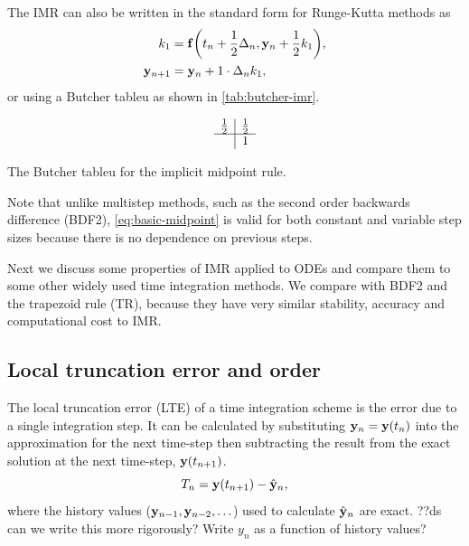 The IMR can also be written in the standard form for Runge-Kutta methods as
\begin{equation}
  \begin{aligned}
    k_1 &= {\mathbf{f}{\left( t_n + \frac{1}{2} \Delta_{n}, \mathbf{y}_n + \frac{1}{2} k_1 \right)}}, \\
    \mathbf{y}_{n+1} &= \mathbf{y}_n + 1 \cdot \Delta_{n} k_1,
  \end{aligned}
\end{equation}
or using a Butcher tableu \cite[135]{HairerNorsettWanner} as shown in \autoref{tab:butcher-imr}.

\begin{table}
  \begin{equation*}
    \begin{array}{c|c}
      \frac{1}{2}  &     \frac{1}{2}  \\
      \hline
                   & 1 \\
    \end{array}
  \end{equation*}
  \caption{The Butcher tableu for the implicit midpoint rule.}
  \label{tab:butcher-imr}
\end{table}

Note that unlike multistep methods, such as the second order backwards difference (BDF2), \eqref{eq:basic-midpoint} is valid for both constant and variable step sizes because there is no dependence on previous steps.

Next we discuss some properties of IMR applied to ODEs and compare them to some other widely used time integration methods.
We compare with BDF2 and the trapezoid rule (TR), because they have very similar stability, accuracy and computational cost to IMR.


\subsection{Local truncation error and order}
\label{sec:deriv-local-trunc}

The local truncation error (LTE) of a time integration scheme is the error due to a single integration step.
It can be calculated by substituting $\mathbf{y}_n = \mathbf{y}(t_n)$ into the approximation for the next time-step then subtracting the result from the exact solution at the next time-step, $\mathbf{y}(t_{n+1})$. 
\ie
\begin{equation}
  T_n = \mathbf{y}(t_{n+1}) - \hat{\mathbf{y}}_n,
\end{equation}
where the history values ($\mathbf{y}_{n-1}, \mathbf{y}_{n-2}, \ldots$) used to calculate $\hat{\mathbf{y}}_n$ are exact.
??ds can we write this more rigorously? Write $y_n$ as a function of history values?

